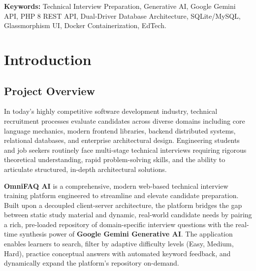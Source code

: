 \documentclass[12pt,a4paper]{report}
\begin{document}
\vspace{1cm}
\textbf{Keywords:} Technical Interview Preparation, Generative AI, Google Gemini API, PHP 8 REST API, Dual-Driver Database Architecture, SQLite/MySQL, Glassmorphism UI, Docker Containerization, EdTech.
\clearpage

\tableofcontents
\clearpage

\listoffigures
{}
\clearpage

\listoftables
{}
\clearpage

\setcounter{page}{1}

\chapter{Introduction}
\label{chap:intro}

\section{Project Overview}
In today's highly competitive software development industry, technical recruitment processes evaluate candidates across diverse domains including core language mechanics, modern frontend libraries, backend distributed systems, relational databases, and enterprise architectural design. Engineering students and job seekers routinely face multi-stage technical interviews requiring rigorous theoretical understanding, rapid problem-solving skills, and the ability to articulate structured, in-depth architectural solutions.

\textbf{OmniFAQ AI} is a comprehensive, modern web-based technical interview training platform engineered to streamline and elevate candidate preparation. Built upon a decoupled client-server architecture, the platform bridges the gap between static study material and dynamic, real-world candidate needs by pairing a rich, pre-loaded repository of domain-specific interview questions with the real-time synthesis power of \textbf{Google Gemini Generative AI}. The application enables learners to search, filter by adaptive difficulty levels (Easy, Medium, Hard), practice conceptual answers with automated keyword feedback, and dynamically expand the platform's repository on-demand.
\end{document}
